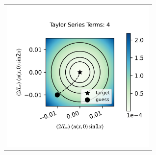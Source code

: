 \documentclass[longbibliography,amsmath,amssymb,aps,nofootinbib]{revtex4-2}
\newcommand\Ra{\mathrm{Ra}}
\begin{document}
\begin{figure}[h]
\begin{tabular}{@{}c@{}}
  \end{tabular}
  \begin{tabular}{@{}c@{}}
      \includegraphics[width=3in]{SPHRtest_Nts4a0p3b0p0c0p0T1p0R0p015kt10p0kt20.png}
  \end{tabular}
\end{figure}
\end{document}
